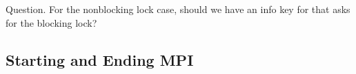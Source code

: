 \documentclass{article}
\begin{document}
Question.  For the nonblocking lock case, should we have an info key
for  that asks for the blocking lock?  

\subsubsection{}
\subsubsection{}
\subsubsection{}
\subsubsection{}

\subsection{Starting and Ending MPI}

\subsubsection{}
\subsubsection{}
\subsubsection{}
\subsubsection{}
\subsubsection{}
\subsubsection{}
\subsubsection{}
\end{document}
